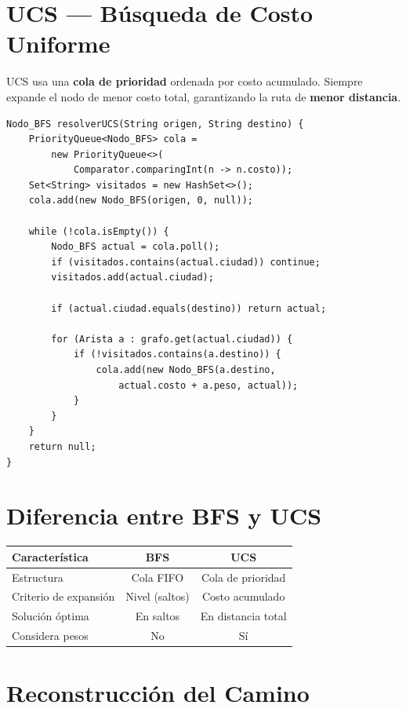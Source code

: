 \documentclass[12pt,a4paper]{article}
\begin{document}
\section{UCS --- Búsqueda de Costo Uniforme}

UCS usa una \textbf{cola de prioridad} ordenada por costo acumulado. Siempre expande el nodo de menor costo total, garantizando la ruta de \textbf{menor distancia}.

\begin{lstlisting}
Nodo_BFS resolverUCS(String origen, String destino) {
    PriorityQueue<Nodo_BFS> cola =
        new PriorityQueue<>(
            Comparator.comparingInt(n -> n.costo));
    Set<String> visitados = new HashSet<>();
    cola.add(new Nodo_BFS(origen, 0, null));

    while (!cola.isEmpty()) {
        Nodo_BFS actual = cola.poll();
        if (visitados.contains(actual.ciudad)) continue;
        visitados.add(actual.ciudad);

        if (actual.ciudad.equals(destino)) return actual;

        for (Arista a : grafo.get(actual.ciudad)) {
            if (!visitados.contains(a.destino)) {
                cola.add(new Nodo_BFS(a.destino,
                    actual.costo + a.peso, actual));
            }
        }
    }
    return null;
}
\end{lstlisting}

\section{Diferencia entre BFS y UCS}

\begin{center}
\begin{tabular}{|l|c|c|}
\hline
\textbf{Característica} & \textbf{BFS} & \textbf{UCS} \\
\hline
Estructura & Cola FIFO & Cola de prioridad \\
Criterio de expansión & Nivel (saltos) & Costo acumulado \\
Solución óptima & En saltos & En distancia total \\
Considera pesos & No & Sí \\
\hline
\end{tabular}
\end{center}

\section{Reconstrucción del Camino}
\end{document}
